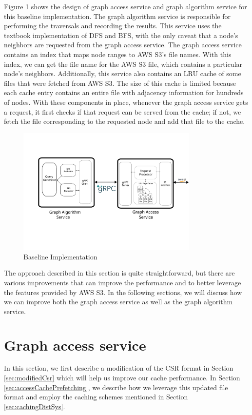 \medskip
Figure \ref{fig:baselineImpl} shows the design of graph access service and graph
algorithm service for this baseline implementation. The graph algorithm service
is responsible for performing the traversals and recording the results. This
service uses the textbook implementation of DFS and BFS, with the only caveat
that a node's neighbors are requested from the graph access service. The graph
access service contains an index that maps node ranges to AWS S3's file names. With
this index, we can get the file name for the AWS S3 file, which contains a particular
node's neighbors. Additionally, this service also contains an LRU cache of some
files that were fetched from AWS S3. The size of this cache is limited because each
cache entry contains an entire file with adjacency information for
hundreds of nodes. With these components in place, whenever the graph access
service gets a request, it first checks if that request can be served from the
cache; if not, we fetch the file corresponding to the requested node and add
that file to the cache.
\begin{figure}[ht]
    \centering
    \includegraphics[width=0.8\textwidth]{figures/baseline.png}
    \caption{Baseline Implementation}
    \label{fig:baselineImpl}
\end{figure}

\medskip
The approach described in this section is quite straightforward, but there are
various improvements that can improve the performance and to better 
leverage the features provided by AWS S3. In the following sections, we will
discuss how we can improve both the graph access service
as well as the graph algorithm service. 

\section{Graph access service}\label{sec:graphAccess}
In this section, we first describe a modification of the CSR format in
Section \ref{sec:modifiedCsr} which will help us improve our cache performance.
In Section \ref{sec:accessCachePrefetching}, we describe how we leverage
this updated file format and employ the caching schemes mentioned in
Section \ref{sec:cachingDistSys}.

